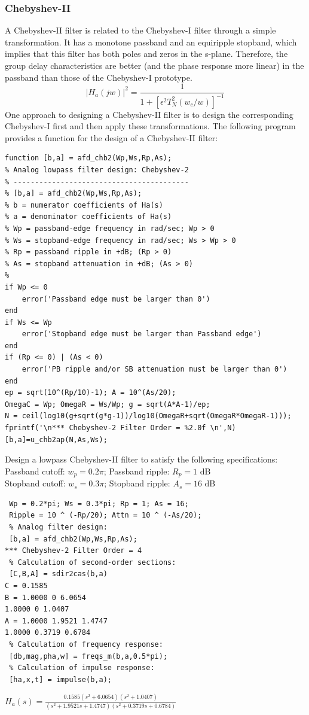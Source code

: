 \documentclass{article}
\begin{document}
\subsubsection{Chebyshev-II}
A Chebyshev-II filter is related to the Chebyshev-I filter through a
simple transformation. It has a monotone passband and an equiripple
stopband, which implies that this filter has both poles and zeros in the
s-plane. Therefore, the group delay characteristics are better (and the
phase response more linear) in the passband than those of the Chebyshev-I
prototype.
\begin{equation}
|H_a(jw)|^2=\frac{1}{1+[\epsilon^2T_N^2(w_c/w)]^{-1}}
\end{equation}
One approach to designing a Chebyshev-II filter is to design the corresponding Chebyshev-I first and then apply these transformations. The following program provides a function for the design of a Chebyshev-II filter:
\begin{lstlisting}
function [b,a] = afd_chb2(Wp,Ws,Rp,As);
% Analog lowpass filter design: Chebyshev-2
% -----------------------------------------
% [b,a] = afd_chb2(Wp,Ws,Rp,As);
% b = numerator coefficients of Ha(s)
% a = denominator coefficients of Ha(s)
% Wp = passband-edge frequency in rad/sec; Wp > 0
% Ws = stopband-edge frequency in rad/sec; Ws > Wp > 0
% Rp = passband ripple in +dB; (Rp > 0)
% As = stopband attenuation in +dB; (As > 0)
%
if Wp <= 0
    error('Passband edge must be larger than 0')
end
if Ws <= Wp
    error('Stopband edge must be larger than Passband edge')
end
if (Rp <= 0) | (As < 0)
    error('PB ripple and/or SB attenuation must be larger than 0')
end
ep = sqrt(10^(Rp/10)-1); A = 10^(As/20);
OmegaC = Wp; OmegaR = Ws/Wp; g = sqrt(A*A-1)/ep;
N = ceil(log10(g+sqrt(g*g-1))/log10(OmegaR+sqrt(OmegaR*OmegaR-1)));
fprintf('\n*** Chebyshev-2 Filter Order = %2.0f \n',N)
[b,a]=u_chb2ap(N,As,Ws);
\end{lstlisting}
Design a lowpass Chebyshev-II filter to satisfy the following specifications: \\
\vspace{1em}
Passband cutoff: $w_p=0.2\pi$; Passband ripple: $R_p=1$ dB \\
\vspace{1em}
Stopband cutoff: $w_s=0.3\pi$; Stopband ripple: $A_s =16$ dB \\
\vspace{1em}
\begin{lstlisting}
 Wp = 0.2*pi; Ws = 0.3*pi; Rp = 1; As = 16;
 Ripple = 10 ^ (-Rp/20); Attn = 10 ^ (-As/20);
 % Analog filter design:
 [b,a] = afd_chb2(Wp,Ws,Rp,As);
*** Chebyshev-2 Filter Order = 4
 % Calculation of second-order sections:
 [C,B,A] = sdir2cas(b,a)
C = 0.1585
B = 1.0000 0 6.0654
1.0000 0 1.0407
A = 1.0000 1.9521 1.4747
1.0000 0.3719 0.6784
 % Calculation of frequency response:
 [db,mag,pha,w] = freqs_m(b,a,0.5*pi);
 % Calculation of impulse response:
 [ha,x,t] = impulse(b,a);    
\end{lstlisting}
\begin{center}
$H_a(s) =\frac{0.1585(s^2+6.0654)(s^2+1.0407)}{(s^2+1.9521s+1.4747)(s^2+0.3719s+0.6784)}$
\end{center}
\end{document}
